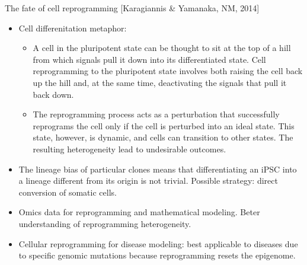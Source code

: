 \documentclass{report}
\begin{document}
The fate of cell reprogramming [Karagiannis \& Yamanaka, NM, 2014]
\begin{itemize}
	\item Cell differenitation metaphor: 
	\begin{itemize}
		\item A cell in the pluripotent state can be thought to sit at the top of a hill from which signals pull it down into its differentiated state. Cell reprogramming to the pluripotent state involves both raising the cell back up the hill and, at the same time, deactivating the signals that pull it back down. 
		
		\item The reprogramming process acts as a perturbation that successfully reprograms the cell only if the cell is perturbed into an ideal state. This state, however, is dynamic, and cells can transition to other states. The resulting heterogeneity lead to undesirable outcomes. 
	\end{itemize}
	
	\item The lineage bias of particular clones means that differentiating an iPSC into a lineage different from its origin is not trivial. Possible strategy: direct conversion of somatic cells. 
	
	\item Omics data for reprogramming and mathematical modeling. Beter understanding of reprogramming heterogeneity. 
	
	\item Cellular reprogramming for disease modeling: best applicable to diseases due to specific genomic mutations because reprogramming resets the epigenome. 
\end{itemize}
\end{document}
